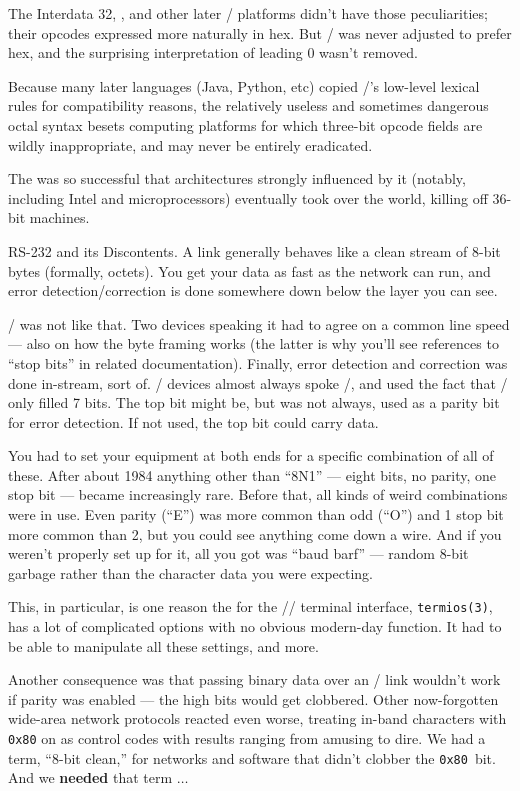 The Interdata 32, , and other later \UNIX/ platforms didn't have those
peculiarities; their opcodes expressed more naturally in hex. But \CEE/ was never
adjusted to prefer hex, and the surprising interpretation of leading 0 wasn't
removed.

Because many later languages (Java, Python, etc) copied \CEE/'s low-level lexical
rules for compatibility reasons, the relatively useless and sometimes dangerous
octal syntax besets computing platforms for which three-bit opcode fields are
wildly inappropriate, and may never be entirely eradicated.

The  was so successful that architectures strongly influenced by it
(notably, including Intel and  microprocessors) eventually took over the
world, killing off 36-bit machines.

\sect RS-232 and its Discontents.
A  link generally behaves like a clean stream of 8-bit bytes (formally,
octets). You get your data as fast as the network can run, and error
detection/correction is done somewhere down below the layer you can see.

\RSTTT/ was not like that. Two devices speaking it had to agree on a common line
speed --- also on how the byte framing works (the latter is why you'll see
references to ``stop bits'' in related documentation). Finally, error detection
and correction was done in-stream, sort of. \RSTTT/ devices almost always spoke
\ASCII/, and used the fact that \ASCII/ only filled 7 bits. The top bit might be,
but was not always, used as a parity bit for error detection. If not used, the
top bit could carry data.

You had to set your equipment at both ends for a specific combination of all of
these. After about 1984 anything other than ``8N1'' --- eight bits, no parity, one
stop bit --- became increasingly rare. Before that, all kinds of weird
combinations were in use. Even parity (``E'') was more common than odd (``O'') and
1 stop bit more common than 2, but you could see anything come down a wire.
And if you weren't properly set up for it, all you got was ``baud barf'' --- random
8-bit garbage rather than the character data you were expecting.

This, in particular, is one reason the  for the /\UNIX/ terminal
interface, {\tt termios(3)}, has a lot of complicated options with no obvious
modern-day function. It had to be able to manipulate all these settings, and
more.

Another consequence was that passing binary data over an \RSTTT/ link wouldn't
work if parity was enabled --- the high bits would get clobbered. Other
now-forgotten wide-area network protocols reacted even worse, treating in-band
characters with {\tt 0x80} on as control codes with results ranging from amusing to
dire. We had a term, ``8-bit clean,'' for networks and software that didn't
clobber the {\tt 0x80}~bit. And we {\bf needed} that term $\ldots$

